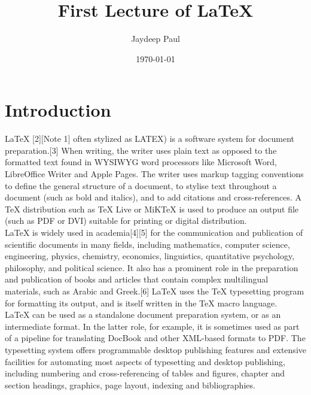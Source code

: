 \documentclass[a4,12pt]{report}
\title{First Lecture of \LaTeX}
\author{Jaydeep Paul}
\date{\today}
\begin{document}
	\maketitle
	\tableofcontents
	\chapter{Introduction}
	
	\hspace{2em}LaTeX [2][Note 1] often stylized as LATEX) is a software system for document preparation.[3] When writing, the writer uses plain text as opposed to the formatted text found in WYSIWYG word processors like Microsoft Word, LibreOffice Writer and Apple Pages. The writer uses markup tagging conventions to define the general structure of a document, to stylise text throughout a document (such as bold and italics), and to add citations and cross-references. A TeX distribution such as TeX Live or MiKTeX is used to produce an output file (such as PDF or DVI) suitable for printing or digital distribution.\\
	
	LaTeX is widely used in academia[4][5] for the communication and publication of scientific documents in many fields, including mathematics, computer science, engineering, physics, chemistry, economics, linguistics, quantitative psychology, philosophy, and political science. It also has a prominent role in the preparation and publication of books and articles that contain complex multilingual materials, such as Arabic and Greek.[6] LaTeX uses the TeX typesetting program for formatting its output, and is itself written in the TeX macro language.\\
	
	LaTeX can be used as a standalone document preparation system, or as an intermediate format. In the latter role, for example, it is sometimes used as part of a pipeline for translating DocBook and other XML-based formats to PDF. The typesetting system offers programmable desktop publishing features and extensive facilities for automating most aspects of typesetting and desktop publishing, including numbering and cross-referencing of tables and figures, chapter and section headings, graphics, page layout, indexing and bibliographies. \\
	
\end{document}
